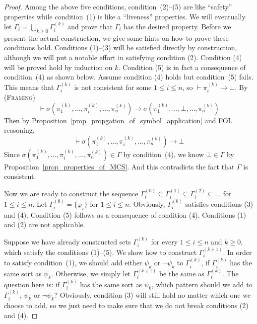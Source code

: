 \documentclass[acmsmall]{acmart}
\theoremstyle{acmdefinition}
\newcommand{\imp}{\to}
\newcommand{\Gammai}[1]{\Gamma_i^{(#1)}}
\newcommand{\Gammaik}{\Gammai{k}}
\newcommand{\pii}[1]{\pi_i^{(#1)}}
\newcommand{\prule}[1]{\textsc{(#1)}}
\newcommand{\framing}{\prule{Framing}\xspace}
\newcommand{\ddd}{,\dots,}
\begin{document}
\begin{proof}
Among the above five conditions, 
condition~(2)--(5) are like ``safety'' properties
while condition~(1) is like a ``liveness'' properties.
We will eventually let $\Gamma_i = \bigcup_{k \ge 0} \Gammai{k}$ and prove that
$\Gamma_i$ has the desired property.
Before we present the actual construction, 
we give some hints on how to prove these conditions hold.
Conditions (1)--(3) will be satisfied directly by construction, although
we will put a notable effort in 
satisfying condition (2).
Condition (4) will be proved hold by induction
on $k$.
Condition (5) is in fact a consequence of condition~(4)
as shown below.
Assume condition (4) holds but condition~(5) fails.
This means that $\Gammai{k}$ is not consistent for some $1 \le i \le n$,
so $\vdash \pii{k} \imp \bot$.
By \framing
$$\vdash \sigma(\pi_1^{(k)} \ddd \pi_i^{(k)} \ddd \pi_n^{(k)}) \imp
        \sigma(\pi_1^{(k)} \ddd \bot \ddd \pi_n^{(k)})$$
Then by Proposition~\ref{prop_propgation_of_symbol_application}
and FOL reasoning,
$$\vdash \sigma(\pi_1^{(k)} \ddd \pi_i^{(k)} \ddd \pi_n^{(k)}) \imp
        \bot$$
Since $\sigma(\pi_1^{(k)} \ddd \pi_i^{(k)} \ddd \pi_n^{(k)}) \in \Gamma$
by condition~(4), 
we know $\bot \in \Gamma$
by Proposition~\ref{prop_properties_of_MCS}.
And this contradicts the fact that $\Gamma$ is consistent.

Now we are ready to construct the sequence
$\Gammai{0} \subseteq \Gammai{1} \subseteq \Gammai{2} \subseteq \dots$ 
for $1 \le i \le n$.
Let
$\Gammai{0} = \{ \varphi_i \}$ for $1 \le i \le n$.
Obviously,
$\Gammai{0}$ satisfies conditions (3) and (4).
Condition (5) follows as a consequence
of condition (4).
Conditions (1) and (2) are not applicable.


Suppose we have already constructed
sets $\Gammai{k}$ for every $1 \le i \le n$ and $k \ge 0$,
which satisfy the conditions (1)--(5).
We show how to construct $\Gammai{k+1}$.
In order to satisfy condition~(1),
we should add either $\psi_k$ or $\neg \psi_k$ to
$\Gammai{k}$, if $\Gammaik$ has the same sort as $\psi_k$.
Otherwise, we simply let $\Gammai{k+1}$ be the same as
$\Gammaik$.
The question here is: if $\Gammaik$ has the same sort as $\psi_k$,
which pattern should we add to $\Gammaik$, 
$\psi_k$ or $\neg \psi_k$?
Obviously, condition (3) will still hold no matter which one we choose
to add,
so we just need to make sure that we do not break
conditions (2) and (4).


\end{proof}
\end{document}
